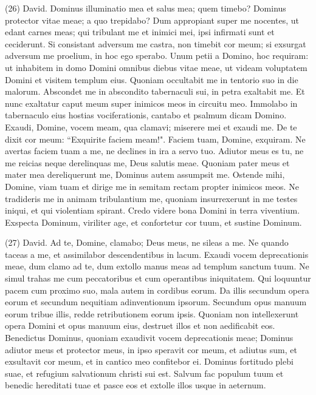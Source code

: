 \begin{biblechapter}  (26) 
\verse David. Dominus illuminatio mea et salus mea; quem timebo? Dominus protector vitae meae; a quo trepidabo? 
\verse Dum appropiant super me nocentes, ut edant carnes meas; qui tribulant me et inimici mei, ipsi infirmati sunt et ceciderunt. 
\verse Si consistant adversum me castra, non timebit cor meum; si exsurgat adversum me proelium, in hoc ego sperabo. 
\verse Unum petii a Domino, hoc requiram: ut inhabitem in domo Domini omnibus diebus vitae meae, ut videam voluptatem Domini et visitem templum eius. 
\verse Quoniam occultabit me in tentorio suo in die malorum. Abscondet me in abscondito tabernaculi sui, in petra exaltabit me. 
\verse Et nunc exaltatur caput meum super inimicos meos in circuitu meo. Immolabo in tabernaculo eius hostias vociferationis, cantabo et psalmum dicam Domino. 
\verse Exaudi, Domine, vocem meam, qua clamavi; miserere mei et exaudi me. 
\verse De te dixit cor meum: “Exquirite faciem meam!". Faciem tuam, Domine, exquiram. 
\verse Ne avertas faciem tuam a me, ne declines in ira a servo tuo. Adiutor meus es tu, ne me reicias neque derelinquas me, Deus salutis meae. 
\verse Quoniam pater meus et mater mea dereliquerunt me, Dominus autem assumpsit me. 
\verse Ostende mihi, Domine, viam tuam et dirige me in semitam rectam propter inimicos meos. 
\verse Ne tradideris me in animam tribulantium me, quoniam insurrexerunt in me testes iniqui, et qui violentiam spirant. 
\verse Credo videre bona Domini in terra viventium. 
\verse Exspecta Dominum, viriliter age, et confortetur cor tuum, et sustine Dominum. 
\end{biblechapter}

\begin{biblechapter}  (27) 
\verse David. Ad te, Domine, clamabo; Deus meus, ne sileas a me. Ne quando taceas a me, et assimilabor descendentibus in lacum. 
\verse Exaudi vocem deprecationis meae, dum clamo ad te, dum extollo manus meas ad templum sanctum tuum. 
\verse Ne simul trahas me cum peccatoribus et cum operantibus iniquitatem. Qui loquuntur pacem cum proximo suo, mala autem in cordibus eorum. 
\verse Da illis secundum opera eorum et secundum nequitiam adinventionum ipsorum. Secundum opus manuum eorum tribue illis, redde retributionem eorum ipsis. 
\verse Quoniam non intellexerunt opera Domini et opus manuum eius, destruet illos et non aedificabit eos. 
\verse Benedictus Dominus, quoniam exaudivit vocem deprecationis meae; 
\verse Dominus adiutor meus et protector meus, in ipso speravit cor meum, et adiutus sum, et exsultavit cor meum, et in cantico meo confitebor ei. 
\verse Dominus fortitudo plebi suae, et refugium salvationum christi sui est. 
\verse Salvum fac populum tuum et benedic hereditati tuae et pasce eos et extolle illos usque in aeternum. 
\end{biblechapter}

